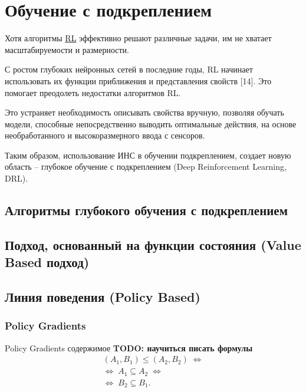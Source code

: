 \section{Обучение с подкреплением} \label{ch1:ml}

Хотя алгоритмы \hyperref[acr:rl]{RL} эффективно решают различные задачи, им не хватает масштабируемости и размерности.

С ростом глубоких нейронных сетей в последние годы, RL начинает использовать их функции приближения и представления свойств [14]. Это помогает преодолеть недостатки алгоритмов RL.

Это устраняет необходимость описывать свойства вручную, позволяя обучать модели, способные непосредственно выводить оптимальные действия, на основе необработанного и высокоразмерного ввода с сенсоров.

Таким образом, использование ИНС в обучении подкреплением, создает новую область – глубокое обучение с подкреплением (Deep Reinforcement Learning, DRL).

\subsection{Алгоритмы глубокого обучения с подкреплением}

\subsection{Подход, основанный на функции состояния (Value Based подход)}

\subsection{Линия поведения (Policy Based)}

\subsubsection{Policy Gradients}

Policy Gradients содержимое
\textbf{TODO: научиться писать формулы}
\begin{equation} 
	\label{eq:fConcept-order-ch1}
	\begin{multlined}
		(A_1,B_1)\leq (A_2,B_2)\; \Leftrightarrow \\  \Leftrightarrow\; A_1\subseteq A_2\; \Leftrightarrow \\ \Leftrightarrow\; B_2\subseteq B_1. 
	\end{multlined}
\end{equation}